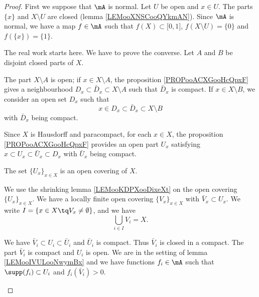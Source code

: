 \begin{proof}
	First we suppose that \( \mA\) is normal. Let \( U\) be open and \( x\in U\). The parts \( \{ x \}\) and \( X\setminus U\) are closed (lemma \ref{LEMooXNSCooQYkmAN}). Since \( \mA\) is normal, we have a map \( f\in\mA\) such that \( f(X)\subset \mathopen[ 0,1\mathclose]\), \( f(X\setminus U)=\{ 0 \}\) and \( f(\{ x \})=\{ 1 \}\).

	The real work starts here. We have to prove the converse. Let \( A\) and \( B\) be disjoint closed parts of \( X\).

	\begin{subproof}
		\begin{subproof}
			The part \( X\setminus A\) is open; if \( x\in X\setminus A\), the proposition \ref{PROPooACXGooHcQpxF} gives a neighbourhood \( D_x\subset\bar D_x\subset X\setminus A\) such that \( \bar D_x\) is compact.
			If \( x\in X\setminus B\), we consider an open set \( D_x\)  such that
			\begin{equation}		\label{EQooTGWCooOQSUyk}
				x\in D_x\subset \bar D_x\subset X\setminus B
			\end{equation}
			with \( \bar D_x\) being compact.
		\end{subproof}
		Since \( X\) is Hausdorff and paracompact, for each \( x\in X\), the proposition \ref{PROPooACXGooHcQpxF} provides an open part \( U_x\) satisfying \( x\subset U_x\subset\bar U_x\subset D_x\) with \( \bar U_x\) being compact.

		The set \( \{ U_x \}_{x\in X}\) is an open covering of \( X\).

		We use the shrinking lemma \ref{LEMooKDPXooDixeXt} on the open covering \( \{ U_x \}_{x\in X}\). We have a locally finite open covering \( \{ V_x \}_{x\in X}\) with \( \bar V_x\subset U_x\). We write \( I=\{ x\in X\tq V_x\neq \emptyset \}\), and we have
		\begin{equation}
			\bigcup_{i\in I}V_i=X.
		\end{equation}

		We have \( \bar V_i\subset U_i\subset\bar U_i\) and \( \bar U_i\) is compact. Thus \( \bar V_i\) is closed in a compact. The part \( \bar V_i\) is compact and \( U_i\) is open. We are in the setting of lemma \ref{LEMooIVULooNwymBx} and we have functions \( f_i\in\mA\) such that \( \supp(f_i)\subset U_i\) and \( f_i(\bar V_i)>0\).


\end{subproof}
\end{proof}
